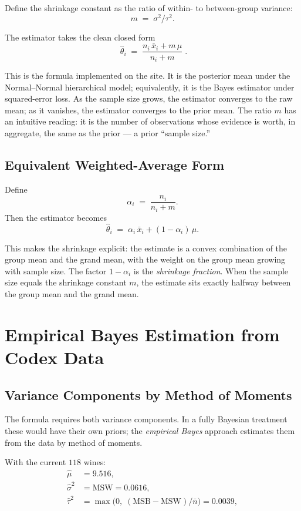 \documentclass[11pt]{article}
\begin{document}
Define the shrinkage constant as the ratio of within- to between-group
variance:
\[
    m \;=\; \sigma^2 / \tau^2.
\]

The estimator takes the clean closed form
\[
    \boxed{\;\hat{\theta}_i \;=\; \frac{n_i\,\bar{x}_i + m\,\mu}{n_i + m}\;}.
\]

This is the formula implemented on the site. It is the posterior mean
under the Normal--Normal hierarchical model; equivalently, it is the
Bayes estimator under squared-error loss. As the sample size grows, the
estimator converges to the raw mean; as it vanishes, the estimator
converges to the prior mean. The ratio $m$ has an intuitive reading: it
is the number of observations whose evidence is worth, in aggregate, the
same as the prior --- a prior ``sample size.''

\subsection{Equivalent Weighted-Average Form}

Define
\[
    \alpha_i \;=\; \frac{n_i}{n_i + m}.
\]
Then the estimator becomes
\[
    \hat{\theta}_i \;=\; \alpha_i\,\bar{x}_i + (1 - \alpha_i)\,\mu.
\]

This makes the shrinkage explicit: the estimate is a convex combination
of the group mean and the grand mean, with the weight on the group mean
growing with sample size. The factor $1 - \alpha_i$ is the
\emph{shrinkage fraction}. When the sample size equals the shrinkage
constant $m$, the estimate sits exactly halfway between the group mean
and the grand mean.

\section{Empirical Bayes Estimation from Codex Data}

\subsection{Variance Components by Method of Moments}

The formula requires both variance components. In a fully Bayesian
treatment these would have their own priors; the \emph{empirical Bayes}
approach estimates them from the data by method of moments.

With the current $118$ wines:
\begin{align*}
    \hat{\mu}      &= 9.516, \\
    \hat{\sigma}^2 &= \mathrm{MSW} = 0.0616, \\
    \hat{\tau}^2   &= \max\!\bigl(0,\; (\mathrm{MSB} - \mathrm{MSW}) / \bar{n}\bigr) = 0.0039,
\end{align*}
\end{document}
